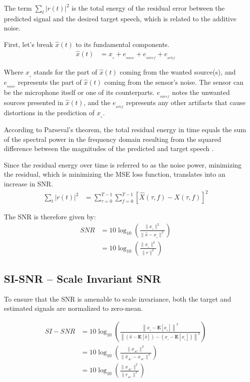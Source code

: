 The term \(\sum_{t} |r(t)|^{2}\) 
is the total energy of the residual error between 
the predicted signal and the desired target speech,
which is related to the additive noise.

First, let's break \(\widehat{x}(t)\) to its fundamental components\cite{1643671}.
\begin{align}
    \widehat{x}(t) & = x_{_{s}} + e_{_{noise}} + e_{_{interf}} + e_{_{artif}}
\end{align}

Where \(x_{_{s}}\) stands for the
part of \(\widehat{x}(t)\) coming from the 
wanted source(s), and \(e_{_{noise}}\) represents the part 
of \(\widehat{x}(t)\) coming from the sensor's noise. The sensor
can be the microphone itself or one of its counterparts.
\(e_{_{interf}}\) notes the unwanted sources presented
in \(\widehat{x}(t)\), and the \(e_{_{artif}}\)
represents any other artifacts that cause
distortions in the prediction of \(x_{_{s}}\).

According to Parseval's theorem, the total residual energy 
in time equals the sum of
the spectral power in the frequency domain
resulting from the squared difference 
between the magnitudes of the predicted and target speech 
\cite{1643671009}.

Since the residual energy over time is referred to as the noise power,
minimizing the residual,
which is minimizing the MSE loss function,
translates into an increase in SNR.
\begin{align}
    \sum_{t} |r(t)|^{2} & = \sum_{\tau=0}^{T-1}\sum_{f=0}^{T-1} \left[ \widehat{X}(\tau, f) - X(\tau, f)\right]^{2}
\end{align}




The SNR is therefore given by:
\begin{align}\label{eq:snr_equation}
    SNR & = 10\log_{10} \left( \frac{ \| x_{_{s}}\|^{2}}{\|\widehat{x} - x_{_{s}} \|^{2}}  \right) \nonumber \\
    & =  10\log_{10} \left( \frac{ \| x_{_{s}} \|^{2}}{\| r \|^{2}} \right)
\end{align}
\subsection{SI-SNR -- Scale Invariant SNR}
To ensure that the SNR is amenable to scale invariance\cite{roux2018sdr},
both the target and estimated signals are normalized to zero-mean.

\begin{align}
    SI-SNR & = 10\log_{10} \left( \frac{\left\| x_{_{s}} - \mathbf{E}[x_{_{s}}]\right\|^{2}}
    {\left\| (\widehat{x} - \mathbf{E}[\widehat{x}]) - (x_{_{s}} - \mathbf{E}[x_{_{s}}]) \right\|^{2}} \right) \nonumber \\
    & = 10\log_{10} \left( \frac{ \| x_{_{AC}}\|^{2}}{\|\widehat{x}_{_{AC}} - x_{_{AC}}\|^{2}}  \right) \nonumber \\
    & =  10\log_{10} \left( \frac{ \| x_{_{AC}}\|^{2}}{\| r_{_{AC}} \|^{2}} \right)
\end{align}

